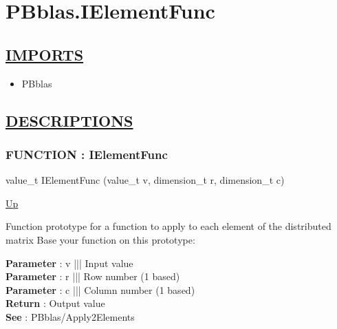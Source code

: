 \chapter*{PBblas.IElementFunc}
\hypertarget{ecldoc:toc:PBblas.IElementFunc}{}

\section*{\underline{IMPORTS}}
\begin{itemize}
\item PBblas
\end{itemize}

\section*{\underline{DESCRIPTIONS}}
\subsection*{FUNCTION : IElementFunc}
\hypertarget{ecldoc:pbblas.ielementfunc}{}
\begin{minipage}[t]{\textwidth}
\begin{flushleft}
value\_t IElementFunc (value\_t v, dimension\_t r, dimension\_t c)
\end{flushleft}
\end{minipage}
\hyperlink{ecldoc:toc:PBblas}{Up}

\par
Function prototype for a function to apply to each element of the distributed matrix Base your function on this prototype:
\par
\textbf{Parameter} : v ||| Input value \\
\textbf{Parameter} : r ||| Row number (1 based) \\
\textbf{Parameter} : c ||| Column number (1 based) \\
\textbf{Return} : Output value \\
\textbf{See} : PBblas/Apply2Elements \\
